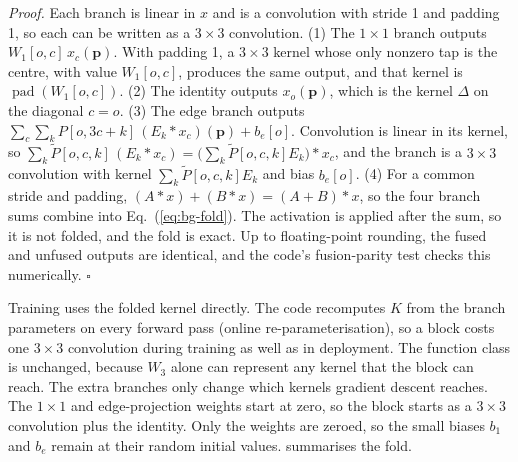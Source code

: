 \emph{Proof.} Each branch is linear in $x$ and is a convolution with stride 1 and padding 1, so each can be written as a $3\times3$ convolution. (1) The $1\times1$ branch outputs $W_1[o,c]\,x_c(\mathbf p)$. With padding 1, a $3\times3$ kernel whose only nonzero tap is the centre, with value $W_1[o,c]$, produces the same output, and that kernel is $\operatorname{pad}(W_1[o,c])$. (2) The identity outputs $x_o(\mathbf p)$, which is the kernel $\Delta$ on the diagonal $c=o$. (3) The edge branch outputs $\sum_c\sum_k P[o,3c+k]\,(E_k\ast x_c)(\mathbf p)+b_e[o]$. Convolution is linear in its kernel, so $\sum_k\tilde P[o,c,k]\,(E_k\ast x_c)=\big(\sum_k\tilde P[o,c,k]E_k\big)\ast x_c$, and the branch is a $3\times3$ convolution with kernel $\sum_k\tilde P[o,c,k]E_k$ and bias $b_e[o]$. (4) For a common stride and padding, $(A\ast x)+(B\ast x)=(A+B)\ast x$, so the four branch sums combine into Eq.~(\ref{eq:bg-fold}). The activation is applied after the sum, so it is not folded, and the fold is exact. Up to floating-point rounding, the fused and unfused outputs are identical, and the code's fusion-parity test checks this numerically. $\square$

Training uses the folded kernel directly. The code recomputes $K$ from the branch parameters on every forward pass (online re-parameterisation), so a block costs one $3\times3$ convolution during training as well as in deployment. The function class is unchanged, because $W_3$ alone can represent any kernel that the block can reach. The extra branches only change which kernels gradient descent reaches. The $1\times1$ and edge-projection weights start at zero, so the block starts as a $3\times3$ convolution plus the identity. Only the weights are zeroed, so the small biases $b_1$ and $b_e$ remain at their random initial values.  summarises the fold.

